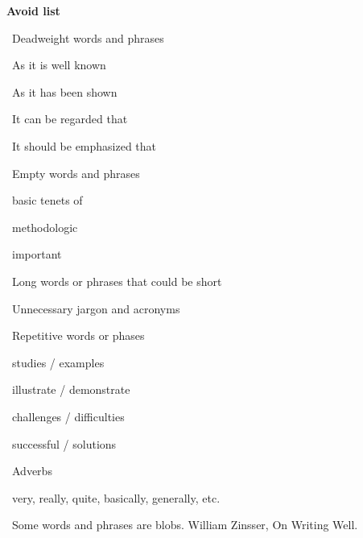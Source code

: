 \documentclass[a4paper, 12pt]{article}
\begin{document}
\vspace{4pt}\par\textbf{Avoid list}
\vspace{4pt}\par\textbullet\ Deadweight words and phrases
\par\quad\textopenbullet\ As it is well known
\par\quad\textopenbullet\ As it has been shown
\par\quad\textopenbullet\ It can be regarded that
\par\quad\textopenbullet\ It should be emphasized that
\vspace{4pt}\par\textbullet\ Empty words and phrases
\par\quad\textopenbullet\ basic tenets of
\par\quad\textopenbullet\ methodologic
\par\quad\textopenbullet\ important
\vspace{4pt}\par\textbullet\ Long words or phrases that could be short
\vspace{4pt}\par\textbullet\ Unnecessary jargon and acronyms
\vspace{4pt}\par\textbullet\ Repetitive words or phases
\par\quad\textopenbullet\ studies / examples
\par\quad\textopenbullet\ illustrate / demonstrate
\par\quad\textopenbullet\ challenges / difficulties
\par\quad\textopenbullet\ successful / solutions
\vspace{4pt}\par\textbullet\ Adverbs
\par\quad\textopenbullet\ very, really, quite, basically, generally, etc.

\vspace{4pt}\par\textbullet\ Some words and phrases are blobs. William Zinsser, On Writing Well.
\end{document}
